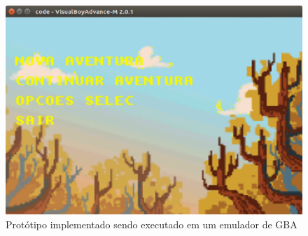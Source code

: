 \begin{figure}[H]
 \centering \includegraphics[keepaspectratio=true,scale=0.6]{figuras/tw-gba-1.eps}
   \caption{Protótipo implementado sendo executado em um emulador de GBA}
   \label{tw-original-1}
\end{figure}